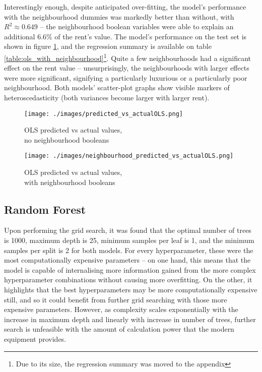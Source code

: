 \documentclass[12pt]{report}
\begin{document}
Interestingly enough, despite anticipated over-fitting, the model's performance with the neighbourhood dummies was markedly better than without, with $R^2\approx0.649$ -- the neighbourhood boolean variables were able to explain an additional 6.6\% of the rent's value. The model's performance on the test set is shown in figure \ref{fig:ols-scatterplot-neighbourhood}, and the regression summary is available on table \ref{table:ols_with_neighbourhood}\footnote{Due to its size, the regression summary was moved to the appendix}. Quite a few neighbourhoods had a significant effect on the rent value -- unsurprisingly, the neighbourhoods with larger effects were more significant, signifying a particularly luxurious or a particularly poor neighbourhood. Both models' scatter-plot graphs show visible markers of heteroscedasticity (both variances become larger with larger rent).

\begin{figure}[H]
	\begin{minipage}{0.4778\textwidth}
		\centering
		\texttt{[image: ./images/predicted\_vs\_actualOLS.png]}
		\caption{OLS predicted vs actual values, \\ no neighbourhood booleans}
		\label{fig:ols-scatterplot}
	\end{minipage}
	\begin{minipage}{0.48\textwidth}
		\centering
		\texttt{[image: ./images/neighbourhood\_predicted\_vs\_actualOLS.png]}
		\caption{OLS predicted vs actual values, \\ with neighbourhood booleans}
		\label{fig:ols-scatterplot-neighbourhood}
	\end{minipage}
\end{figure}

\subsection{Random Forest}
Upon performing the grid search, it was found that the optimal number of trees is 1000, maximum depth is 25, minimum samples per leaf is 1, and the minimum samples per split is 2 for both models. For every hyperparameter, these were the most computationally expensive parameters -- on one hand, this means that the model is capable of internalising more information  gained from the more complex hyperparameter combinations without causing more overfitting. On the other, it highlights that the best hyperparameters may be more computationally expensive still, and so it could benefit from further grid searching with those more expensive parameters. However, as complexity scales exponentially with the increase in maximum depth and linearly with increase in number of trees, further search is unfeasible with the amount of calculation power that the modern equipment provides.
\end{document}
